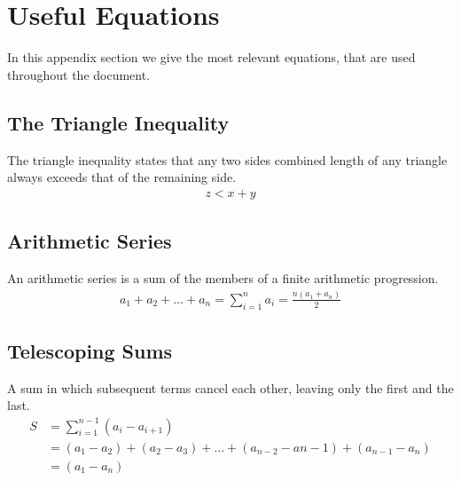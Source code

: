 
\thispagestyle{fancyplain}

\chapter{Useful Equations}
In this appendix section we give the most relevant equations, that are used
throughout the document.

\section{The Triangle Inequality}
\label{appendix:equations|eqn:triangle-inequality}
The triangle inequality states that any two sides combined length of any
triangle always exceeds that of the remaining side.
\begin{align}
	z < x + y
\end{align}

\section{Arithmetic Series}
\label{appendix:equations|eqn:arithmetic-series}
An arithmetic series is a sum of the members of a finite arithmetic
progression.
\begin{align}
	a_1 + a_2 + \dots + a_n = \sum_{i=1}^{n}a_i = \frac{n(a_1 + a_n)}{2}
\end{align}

\section{Telescoping Sums}
\label{appendix:equations|eqn:telescoping}
A sum in which subsequent terms cancel each other, leaving only the first and
the last.
\begin{align}
	S &= \sum_{i=1}^{n-1}(a_{i} - a_{i+1}) \\
	&= (a_1-a_2)+(a_2-a_3) + \dots + (a_{n-2}-a{n-1}) + (a_{n-1}-a_n)
	\nonumber \\
	&= (a_1 - a_n) \nonumber
\end{align}

